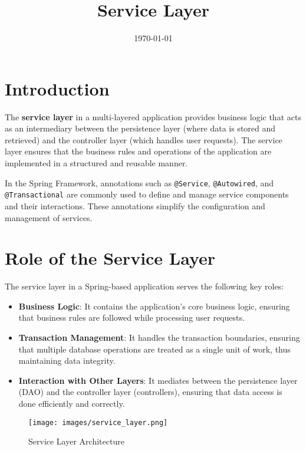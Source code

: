 \documentclass{article}
\title{Service Layer}
\date{\today}
\begin{document}
\maketitle

\section{Introduction}
The \textbf{service layer} in a multi-layered application provides business logic that acts as an intermediary between the persistence layer (where data is stored and retrieved) and the controller layer (which handles user requests). The service layer ensures that the business rules and operations of the application are implemented in a structured and reusable manner. 

In the Spring Framework, annotations such as \texttt{@Service}, \texttt{@Autowired}, and \texttt{@Transactional} are commonly used to define and manage service components and their interactions. These annotations simplify the configuration and management of services.

\section{Role of the Service Layer}
The service layer in a Spring-based application serves the following key roles:

\begin{itemize}
    \item \textbf{Business Logic}: It contains the application's core business logic, ensuring that business rules are followed while processing user requests.
    \item \textbf{Transaction Management}: It handles the transaction boundaries, ensuring that multiple database operations are treated as a single unit of work, thus maintaining data integrity.
    \item \textbf{Interaction with Other Layers}: It mediates between the persistence layer (DAO) and the controller layer (controllers), ensuring that data access is done efficiently and correctly.
\end{itemize}

\begin{figure}[H]
    \centering
    \begin{framed}
        \texttt{[image: images/service\_layer.png]}
    \end{framed}
    \caption{Service Layer Architecture}
    \label{fig:service-layer}
\end{figure}
\end{document}
